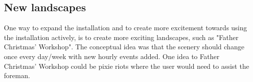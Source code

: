 \subsection{New landscapes}
One way to expand the installation and to create more excitement towards using the installation actively, is to create more exciting landscapes, such as "Father Christmas' Workshop". The conceptual idea was that the scenery should change once every day/week with new hourly events added. One idea to Father Christmas' Workshop could be pixie riots where the user would need to assist the foreman. 




